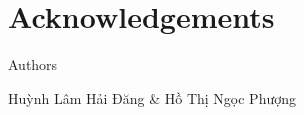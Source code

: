 \chapter{Acknowledgements}
\label{chapter:acknowledgements}
\begin{flushright}
  \begin{minipage}{10cm}
  \centering
  Authors
  
  Huỳnh Lâm Hải Đăng \& Hồ Thị Ngọc Phượng
  \end{minipage}
\end{flushright}
